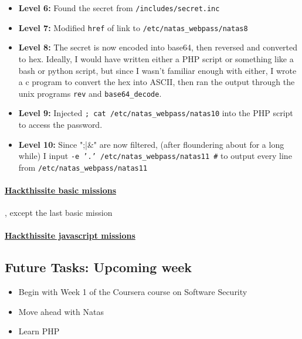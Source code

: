 \documentclass{article}
\def\code#1{\texttt{#1}}
\begin{document}
\begin{itemize}
\begin{itemize}
    \item \textbf{Level 6: } Found the secret from \code{/includes/secret.inc}
    
    \item \textbf{Level 7: } Modified \code{href} of link to \code{/etc/natas\_webpass/natas8}
    
    \item \textbf{Level 8: } The secret is now encoded into base64, then reversed and converted to hex. Ideally, I would have written either a PHP script or something like a bash or python script, but since I wasn't familiar enough with either, I wrote a c program to convert the hex into ASCII, then ran the output through the unix programs \code{rev} and \code{base64\_decode}.
    
    \item \textbf{Level 9: } Injected \code{; cat /etc/natas\_webpass/natas10} into the PHP script to access the password.
    
    \item \textbf{Level 10: } Since ";|&" are now filtered, (after floundering about for a long while) I input \code{-e '.' /etc/natas\_webpass/natas11 #} to output every line from \code{/etc/natas\_webpass/natas11}
    
\end{itemize}

\paragraph{\href{http://hackthissite.org/missions/basic}{Hackthissite basic missions}}, except the last basic mission

\paragraph{\href{http://hackthissite.org/missions/javascript}{Hackthissite javascript missions}}

\subsection*{Future Tasks: Upcoming week}
\begin{itemize}
    \item Begin with Week 1 of the Coursera course on Software Security
    \item Move ahead with Natas
    \item Learn PHP
\end{itemize}


\end{itemize}
\end{document}
